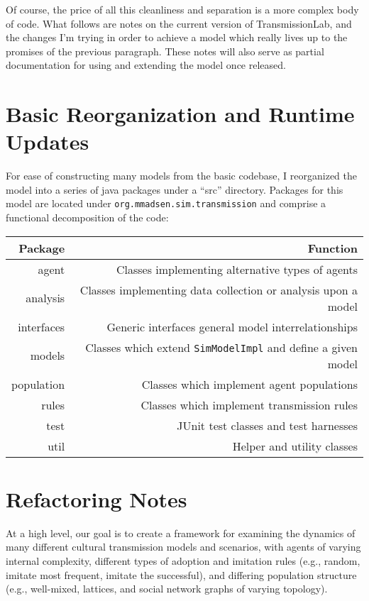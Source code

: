 \documentclass{kluwer-mem-copyright}
\begin{document}
\begin{article}
Of course, the price of all this cleanliness and separation is a more complex
body of code.  What follows are notes on the current version of TransmissionLab, and the changes I'm trying in order to achieve a model which
really lives up to the promises of the previous paragraph.  These notes will
also serve as partial documentation for using and extending the model once
released.  

\section{Basic Reorganization and Runtime Updates}
For ease of constructing many models from the basic codebase, I reorganized the
model into a series of java packages under a ``src'' directory.  Packages for
this model are located under \texttt{org.mmadsen.sim.transmission} and comprise
a functional decomposition of the code:\\
\begin{tabular}{|r|r|}
\hline
Package&Function\\
\hline
agent&Classes implementing alternative types of agents\\
analysis&Classes implementing data collection or analysis upon a model\\
interfaces&Generic interfaces general model interrelationships\\
models&Classes which extend \texttt{SimModelImpl} and define a given model\\
population&Classes which implement agent populations\\ 
rules&Classes which implement transmission rules\\
test&JUnit test classes and test harnesses \\
util&Helper and utility classes\\
\hline
\end{tabular}


\section{Refactoring Notes}
At a high level, our goal is to create a framework for examining the dynamics of
many different cultural transmission models and scenarios, with agents of
varying internal complexity, different types of adoption and imitation rules
(e.g., random, imitate most frequent, imitate the successful), and differing
population structure (e.g., well-mixed, lattices, and social network graphs of
varying topology).  


\end{article}
\end{document}
